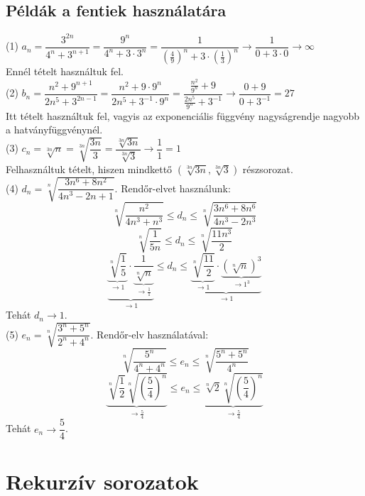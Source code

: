 \documentclass[a4paper,12pt,twoside]{book}
\theoremstyle{break}
\theoremstyle{plain}
\begin{document}
\subsection{Példák a fentiek használatára}

(1) $a_n=\dfrac{3^{2n}}{4^n+3^{n+1}}=\dfrac{9^n}{4^n+3\cdot 3^n}=\dfrac{1}{\left(\frac{4}{9}\right)^n+3\cdot \left(\frac{1}{3}\right)^n}\to \dfrac{1}{0+3\cdot 0} \to \infty$\\
Ennél  tételt használtuk fel.\\

(2) $b_n=\dfrac{n^2+9^{n+1}}{2n^5+3^{2n-1}}=\dfrac{n^2+9\cdot 9^n}{2n^5+3^{-1}\cdot 9^n}=\dfrac{\frac{n^2}{9^n}+9}{\frac{2n^5}{9^n}+3^{-1}} \to \dfrac{0+9}{0+3^{-1}} = 27$\\
Itt  tételt használtuk fel, vagyis az exponenciális függvény nagyságrendje nagyobb a hatványfüggvénynél.\\

(3) $c_n=\sqrt[3n]{n}=\sqrt[3n]{\dfrac{3n}{3}} = \dfrac{\sqrt[3n]{3n}}{\sqrt[3n]{3}} \to \dfrac{1}{1} = 1$\\
Felhasználtuk  tételt, hiszen mindkettő $\left(\sqrt[3n]{3n}, \sqrt[3n]{3}\right)$ részsorozat.\\

(4) $d_n = \sqrt[n]{\dfrac{3n^6+8n^2}{4n^3-2n+1}}$. Rendőr-elvet használunk:
\[\sqrt[n]{\dfrac{n^2}{4n^3+n^3}} \leqslant d_n \leqslant \sqrt[n]{\dfrac{3n^6+8n^6}{4n^3-2n^3}}\]
\[\sqrt[n]{\dfrac{1}{5n}} \leqslant d_n \leqslant \sqrt[n]{\dfrac{11n^3}{2}}\]
\[\underbrace{\underbrace{\sqrt[n]{\dfrac{1}{5}}}_{\to 1}\cdot\underbrace{\dfrac{1}{\sqrt[n]{n}}}_{\to \frac{1}{1}}}_{\to 1} \leqslant d_n \leqslant \underbrace{\underbrace{\sqrt[n]{\dfrac{11}{2}}}_{\to 1}\cdot\underbrace{\left(\sqrt[n]{n}\right)^3}_{\to 1^3}}_{\to 1}\]
Tehát $d_n\to 1$.\\

(5) $e_n = \sqrt[n]{\dfrac{3^n+5^n}{2^n+4^n}}$. Rendőr-elv használatával:
\[\sqrt[n]{\dfrac{5^n}{4^n+4^n}} \leqslant e_n \leqslant \sqrt[n]{\dfrac{5^n+5^n}{4^n}}\]
\[\underbrace{\sqrt[n]{\frac{1}{2}}\sqrt[n]{\left(\dfrac{5}{4}\right)^n}}_{\to \frac{5}{4}} \leqslant e_n \leqslant \underbrace{\sqrt[n]{2}\sqrt[n]{\left(\dfrac{5}{4}\right)^n}}_{\to \frac{5}{4}}\]
Tehát $e_n \to \dfrac{5}{4}$.

\section{Rekurzív sorozatok}
\end{document}
